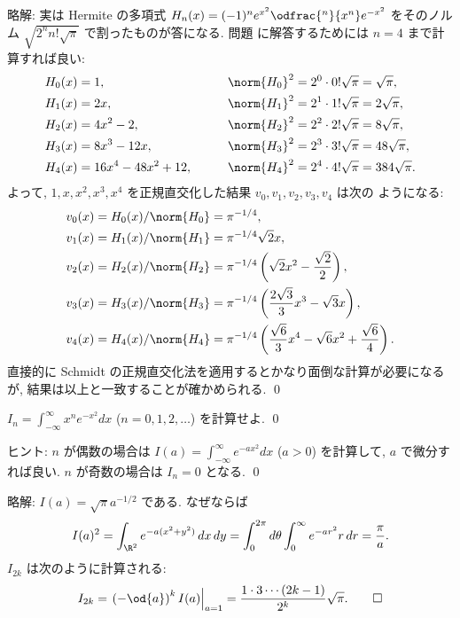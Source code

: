 \documentclass[12pt,twoside]{jarticle}
\newcommand\commentout[1]{#1}
\newcommand\commentout[1]{}
\begin{document}
\commentout{
\medskip
\noindent
略解: 実は Hermite の多項式 $H_n(x)=(-1)^ne^{x^2}\odfrac{^n}{x^n}e^{-x^2}$ 
をそのノルム $\sqrt{2^nn!\sqrt{\pi}}$ で割ったものが答になる. 
問題 \qref{q:Hermite-polyn-2} に解答するためには $n=4$ まで計算すれば良い:
\begin{alignat*}{2}
  & H_0(x) = 1, &
  \qquad
  & \norm{H_0}^2 = 2^0\cdot0!\sqrt{\pi} = \sqrt{\pi},
  \\
  & H_1(x) = 2x, &
  \qquad
  & \norm{H_1}^2 = 2^1\cdot1!\sqrt{\pi} = 2\sqrt{\pi},
  \\
  & H_2(x) = 4x^2 - 2, &
  \qquad
  & \norm{H_2}^2 = 2^2\cdot2!\sqrt{\pi} = 8\sqrt{\pi},
  \\
  & H_3(x) = 8x^3 - 12x, &
  \qquad
  & \norm{H_3}^2 = 2^3\cdot3!\sqrt{\pi} = 48\sqrt{\pi},
  \\
  & H_4(x) = 16x^4 - 48x^2 + 12, &
  \qquad
  & \norm{H_4}^2 = 2^4\cdot4!\sqrt{\pi} = 384\sqrt{\pi}.
\end{alignat*}
よって, $1,x,x^2,x^3,x^4$ を正規直交化した結果 $v_0,v_1,v_2,v_3,v_4$ は次の
ようになる:
\begin{align*}
  &
  v_0(x) = H_0(x)/\norm{H_0} = \pi^{-1/4},
  \\ &
  v_1(x) = H_1(x)/\norm{H_1} =\pi^{-1/4}\sqrt{2}x,
  \\ &
  v_2(x) = H_2(x)/\norm{H_2} 
  =\pi^{-1/4}\left(\sqrt{2}x^2 - \frac{\sqrt{2}}{2}\right),
  \\ &
  v_3(x) = H_3(x)/\norm{H_3} 
  =\pi^{-1/4}\left( \frac{2\sqrt{3}}{3}x^3 - \sqrt{3}x\right),
  \\ &
  v_4(x) = H_4(x)/\norm{H_4} 
  =\pi^{-1/4}\left(
    \frac{\sqrt{6}}{3}x^4 - \sqrt{6}x^2 + \frac{\sqrt{6}}{4}
  \right).
\end{align*}
直接的に Schmidt の正規直交化法を適用するとかなり面倒な計算が必要になるが, 
結果は以上と一致することが確かめられる.
\qed
}


\begin{question}
\label{q:In}
  $I_n=\int_{-\infty}^\infty x^n e^{-x^2}dx$ 
  \enspace ($n=0,1,2,\ldots$) を計算せよ.
  \qed
\end{question}

\medskip
\noindent
ヒント: $n$ が偶数の場合は $I(a)=\int_{-\infty}^\infty e^{-ax^2}dx$ 
\enspace ($a>0$) を計算して, $a$ で微分すれば良い.  
$n$ が奇数の場合は $I_n = 0$ となる.
\qed

\commentout{
\medskip
\noindent
略解: $I(a) = \sqrt{\pi} a^{-1/2}$ である. なぜならば
\begin{equation*}
  I(a)^2 = \int_{\R^2} e^{-a(x^2+y^2)}\,dx\,dy
  = \int_0^{2\pi}d\theta \int_0^\infty e^{-ar^2} r\,dr
  = \frac{\pi}{a}.
\end{equation*}
$I_{2k}$ は次のように計算される:
\begin{equation*}
  I_{2k} = \left.\left(-\od{a}\right)^k I(a)\right|_{a=1}
  = \frac{1\cdot3\cdots(2k-1)}{2^k}\sqrt{\pi}.
\qed
\end{equation*}
}
\end{document}
